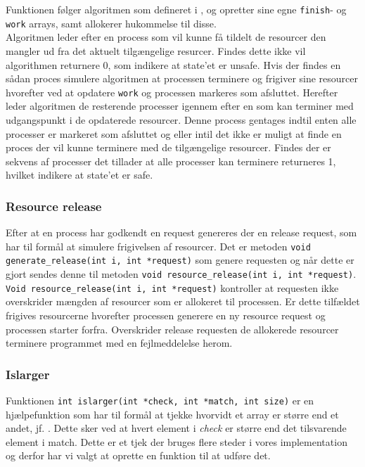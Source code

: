 \documentclass[main.tex]{subfile}
\begin{document}
Funktionen følger algoritmen som defineret i \cite{SA:2013}, og opretter sine egne \texttt{finish}- og \texttt{work} arrays, samt allokerer hukommelse til disse.\\

Algoritmen leder efter en process som vil kunne få tildelt de resourcer den mangler ud fra det aktuelt tilgængelige resurcer. Findes dette ikke vil algorithmen returnere 0, som indikere at state'et er unsafe. Hvis der findes en sådan proces simulere algoritmen at processen terminere og frigiver sine resourcer hvorefter ved at opdatere \texttt{work} og processen markeres som afsluttet. Herefter leder algoritmen de resterende processer igennem efter en som kan terminer med udgangspunkt i de opdaterede resourcer. Denne process gentages indtil enten alle processer er markeret som afsluttet og eller intil det ikke er muligt at finde en proces der vil kunne terminere med de tilgængelige resourcer. Findes der er sekvens af processer det tillader at alle processer kan terminere returneres 1, hvilket indikere at state'et er safe.

\subsubsection{Resource release}
Efter at en process har godkendt en request genereres der en release request, som har til formål at simulere frigivelsen af resourcer. Det er metoden \texttt{void generate\_release(int i, int *request)} som genere requesten og når dette er gjort sendes denne til metoden \texttt{void resource\_release(int i, int *request)}.\\

\texttt{Void resource\_release(int i, int *request)} kontroller at requesten ikke overskrider mængden af resourcer som er allokeret til processen. Er dette tilfældet frigives resourcerne hvorefter processen generere en ny resource request og processen starter forfra. Overskrider release requesten de allokerede resourcer terminere programmet med en fejlmeddelelse herom.\\

\subsubsection{Islarger}
Funktionen \texttt{int islarger(int *check, int *match, int size)} er en hjælpefunktion som har til formål at tjekke hvorvidt et array er større end et andet, jf. \cite[s. 331]{SA:2013}
. Dette sker ved at hvert element i \emph{check} er større end det tilsvarende element i match. Dette er et tjek der bruges flere steder i vores implementation og derfor har vi valgt at oprette en funktion til at udføre det.
\end{document}
